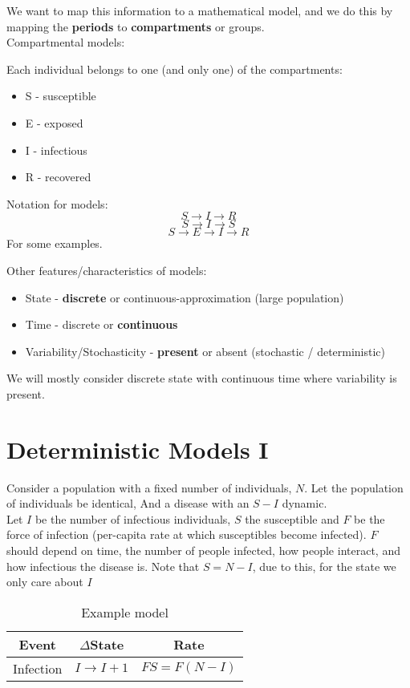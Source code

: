 \documentclass{/home/janmebows/Documents/LatexTemplates/myassignment}
\begin{document}
We want to map this information to a mathematical model, and we do this by mapping the \textbf{periods} to \textbf{compartments} or groups.\\


Compartmental models:


Each individual belongs to one (and only one) of the compartments:
\begin{itemize}
    \item S - susceptible
    \item E - exposed
    \item I - infectious
    \item R - recovered
\end{itemize}
Notation for models:
\[S\to I \to R\]
\[S\to I\to S\]
\[S\to E\to I\to R\]
For some examples.


Other features/characteristics of models:
\begin{itemize}
    \item State - \textbf{discrete} or continuous-approximation (large population)
    \item Time  - discrete or \textbf{continuous}
    \item Variability/Stochasticity - \textbf{present} or absent (stochastic / deterministic)
\end{itemize}

We will mostly consider discrete state with continuous time where variability is present.


\section{Deterministic Models I}
Consider a population with a fixed number of individuals, $N$. Let the population of individuals be identical, And a disease with an $S-I$ dynamic.\\
Let $I$ be the number of infectious individuals, $S$ the susceptible and $F$ be the force of infection (per-capita rate at which susceptibles become infected).
$F$ should depend on time, the number of people infected, how people interact, and how infectious the disease is. Note that $S = N-I$, due to this, for the state we only care about $I$
\begin{table}[h]
    \centering
    \begin{tabular}{c|c|c}
         Event&$\Delta$State&Rate  \\
         \hline
         Infection&$I\to I+1$&$FS= F(N-I)$
    \end{tabular}
    \caption{Example model}
\end{table}
\end{document}
